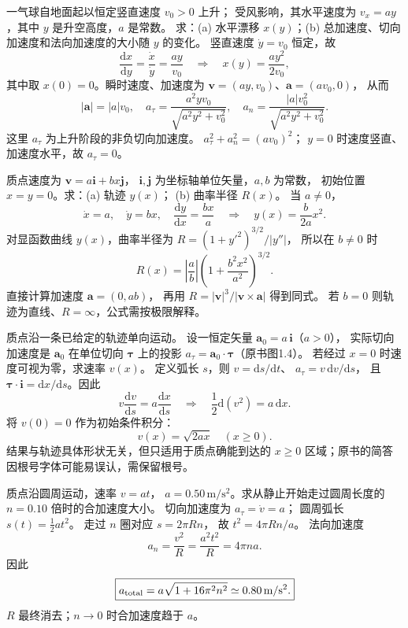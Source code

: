 一气球自地面起以恒定竖直速度 $v_0>0$ 上升；
受风影响，其水平速度为 $v_x=ay$，其中 $y$ 是升空高度，$a$ 是常数。
求：(a) 水平漂移 $x(y)$；(b) 总加速度、切向加速度和法向加速度的大小随 $y$ 的变化。
\exsolution
竖直速度 $\dot y=v_0$ 恒定，故
\[
 \frac{\mathrm dx}{\mathrm dy}=\frac{\dot x}{\dot y}=\frac{ay}{v_0}
 \quad\Longrightarrow\quad
 \boxed{x(y)=\frac{ay^2}{2v_0}},
\]
其中取 $x(0)=0$。瞬时速度、加速度为
$\bm v=(ay,v_0)$、$\bm a=(av_0,0)$，
从而
\[
 \boxed{|\bm a|=|a|v_0,\quad
 a_\tau=\frac{a^2yv_0}{\sqrt{a^2y^2+v_0^2}},\quad
 a_n=\frac{|a|v_0^2}{\sqrt{a^2y^2+v_0^2}}.}
\]
这里 $a_\tau$ 为上升阶段的非负切向加速度。
\excheck $a_\tau^2+a_n^2=(av_0)^2$；
$y=0$ 时速度竖直、加速度水平，故 $a_\tau=0$。

质点速度为 $\bm v=a\bm i+bx\bm j$，
$\bm i,\bm j$ 为坐标轴单位矢量，$a,b$ 为常数，
初始位置 $x=y=0$。求：(a) 轨迹 $y(x)$；
(b) 曲率半径 $R(x)$。
\exsolution
当 $a\ne0$，
\[
 \dot x=a,\quad\dot y=bx,\quad
 \frac{\mathrm dy}{\mathrm dx}=\frac{bx}{a}
 \quad\Longrightarrow\quad
 \boxed{y(x)=\frac b{2a}x^2}.
\]
对显函数曲线 $y(x)$，曲率半径为
$R=(1+y'^2)^{3/2}/|y''|$，
所以在 $b\ne0$ 时
\[
 \boxed{R(x)=\left|\frac ab\right|
 \left(1+\frac{b^2x^2}{a^2}\right)^{3/2}.}
\]
\excheck 直接计算加速度 $\bm a=(0,ab)$，
再用 $R=|\bm v|^3/|\bm v\times\bm a|$ 得到同式。
若 $b=0$ 则轨迹为直线、$R=\infty$，公式需按极限解释。

质点沿一条已给定的轨迹单向运动。
设一恒定矢量 $\bm a_0=a\,\bm i$（$a>0$），
实际切向加速度是 $\bm a_0$ 在单位切向 $\bm\tau$
上的投影 $a_\tau=\bm a_0\cdot\bm\tau$（原书图1.4）。
若经过 $x=0$ 时速度可视为零，求速率 $v(x)$。
\exsolution
定义弧长 $s$，则 $v=\mathrm ds/\mathrm dt$、
$a_\tau=v\,\mathrm dv/\mathrm ds$，
且 $\bm\tau\cdot\bm i=\mathrm dx/\mathrm ds$。因此
\[
 v\frac{\mathrm dv}{\mathrm ds}
 =a\frac{\mathrm dx}{\mathrm ds}
 \quad\Longrightarrow\quad
 \frac12\mathrm d(v^2)=a\,\mathrm dx .
\]
将 $v(0)=0$ 作为初始条件积分：
\[
 \boxed{v(x)=\sqrt{2ax}}\quad (x\ge0).
\]
\excheck 结果与轨迹具体形状无关，但只适用于质点确能到达的
$x\ge0$ 区域；原书的简答因根号字体可能易误认，需保留根号。

质点沿圆周运动，速率 $v=at$，
$a=0.50\,\mathrm{m/s^2}$。求从静止开始走过圆周长度的
$n=0.10$ 倍时的合加速度大小。
\exsolution
切向加速度为 $a_\tau=\dot v=a$；
圆周弧长 $s(t)=\frac12at^2$。
走过 $n$ 圈对应 $s=2\pi Rn$，
故 $t^2=4\pi Rn/a$。
法向加速度
\[
 a_n=\frac{v^2}{R}=\frac{a^2t^2}{R}=4\pi na .
\]
因此
\[
 \boxed{a_{\rm total}=a\sqrt{1+16\pi^2n^2}
 \simeq 0.80\,\mathrm{m/s^2}.}
\]
\excheck $R$ 最终消去；$n\to0$ 时合加速度趋于 $a$。

